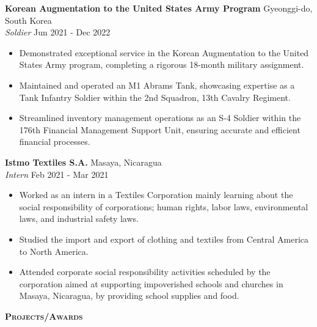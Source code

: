 \documentclass[a4paper]{article}
\newcommand{\lineunder} {
    \vspace*{-8pt} \\
    \hspace*{-18pt} \hrulefill \\
}
\newcommand{\header} [1] {
    {\hspace*{-18pt}\vspace*{6pt} \textsc{#1}}
    \vspace*{-6pt} \lineunder
}
\begin{document}
\textbf{Korean Augmentation to the United States Army Program} 
\hfill Gyeonggi-do, South Korea\\
\textit{Soldier} \hfill Jun 2021 - Dec 2022\\
\vspace{-1mm}
    \begin{itemize}[noitemsep]
        \item Demonstrated exceptional service in the \textquotedbl{}Korean 
        Augmentation to the United States Army\textquotedbl{} program, completing
         a rigorous 18-month military assignment.
        \item Maintained and operated an M1 Abrams Tank, showcasing expertise 
        as a Tank Infantry Soldier within the 2nd Squadron, 13th Cavalry Regiment.
        \item Streamlined inventory management operations as an S-4 Soldier 
        within the 176th Financial Management Support Unit, ensuring accurate 
        and efficient financial processes.
\end{itemize}
\vspace{1mm}

\textbf{Istmo Textiles S.A.} \hfill Masaya, Nicaragua\\
\textit{Intern} \hfill Feb 2021 - Mar 2021\\
\vspace{-1mm}
    \begin{itemize}[noitemsep]
	\item Worked as an intern in a Textiles Corporation mainly learning about the social responsibility of corporations; human rights, labor laws, environmental laws, and industrial safety laws. 
	\item Studied the import and export of clothing and textiles from Central America to North America. 
    \item Attended corporate social responsibility activities scheduled by the corporation aimed at supporting impoverished schools and churches in Masaya, Nicaragua, by providing school supplies and food.
\end{itemize}

\vspace*{1mm}

\header{\textbf{Projects/Awards}}
\end{document}
